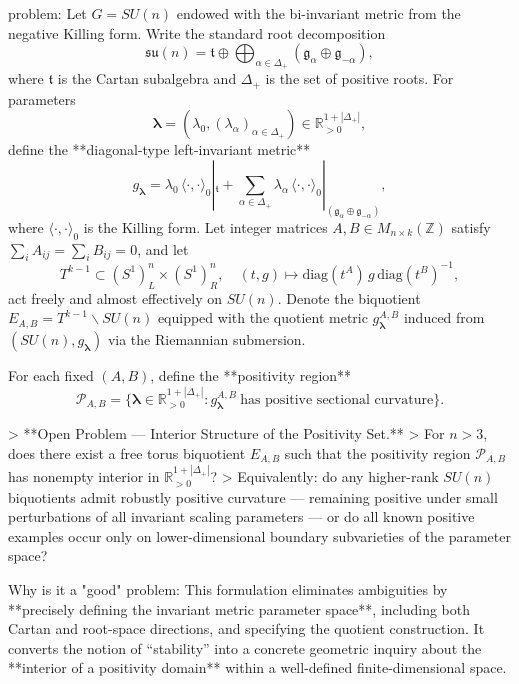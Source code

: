 problem:  
Let \(G=SU(n)\) endowed with the bi-invariant metric from the negative Killing form.  
Write the standard root decomposition
\[
\mathfrak{su}(n)=\mathfrak{t}\oplus\bigoplus_{\alpha\in\Delta_+}(\mathfrak{g}_\alpha\oplus\mathfrak{g}_{-\alpha}),
\]
where \(\mathfrak{t}\) is the Cartan subalgebra and \(\Delta_+\) is the set of positive roots.  
For parameters 
\[
\boldsymbol{\lambda}=(\lambda_0,(\lambda_\alpha)_{\alpha\in \Delta_+})\in \mathbb{R}_{>0}^{1+|\Delta_+|},
\]
define the **diagonal-type left-invariant metric**
\[
g_{\boldsymbol{\lambda}}=\lambda_0\,\langle\cdot,\cdot\rangle_0|_{\mathfrak{t}}
+ \sum_{\alpha\in\Delta_+} \lambda_\alpha\, \langle\cdot,\cdot\rangle_0|_{(\mathfrak{g}_\alpha\oplus\mathfrak{g}_{-\alpha})},
\]
where \(\langle\cdot,\cdot\rangle_0\) is the Killing form.  
Let integer matrices \(A,B\in M_{n\times k}(\mathbb{Z})\) satisfy \(\sum_i A_{ij}=\sum_i B_{ij}=0\), and let
\[
T^{k-1}\subset (S^1)^n_L\times (S^1)^n_R,\quad (t,g)\mapsto \mathrm{diag}(t^A)\,g\,\mathrm{diag}(t^B)^{-1},
\]
act freely and almost effectively on \(SU(n)\).  
Denote the biquotient \(E_{A,B}=T^{k-1}\backslash SU(n)\) equipped with the quotient metric \(g^{A,B}_{\boldsymbol{\lambda}}\) induced from \((SU(n),g_{\boldsymbol{\lambda}})\) via the Riemannian submersion.  

For each fixed \((A,B)\), define the **positivity region**
\[
\mathcal{P}_{A,B}=\{\boldsymbol{\lambda}\in \mathbb{R}_{>0}^{1+|\Delta_+|} : g^{A,B}_{\boldsymbol{\lambda}}\ \text{has positive sectional curvature}\}.
\]

> **Open Problem — Interior Structure of the Positivity Set.**  
> For \(n>3\), does there exist a free torus biquotient \(E_{A,B}\) such that the positivity region \(\mathcal{P}_{A,B}\) has nonempty interior in \(\mathbb{R}_{>0}^{1+|\Delta_+|}\)?  
> Equivalently: do any higher-rank \(SU(n)\) biquotients admit robustly positive curvature — remaining positive under small perturbations of all invariant scaling parameters — or do all known positive examples occur only on lower-dimensional boundary subvarieties of the parameter space?

Why is it a "good" problem:  
This formulation eliminates ambiguities by **precisely defining the invariant metric parameter space**, including both Cartan and root-space directions, and specifying the quotient construction. It converts the notion of “stability” into a concrete geometric inquiry about the **interior of a positivity domain** within a well-defined finite-dimensional space.  

